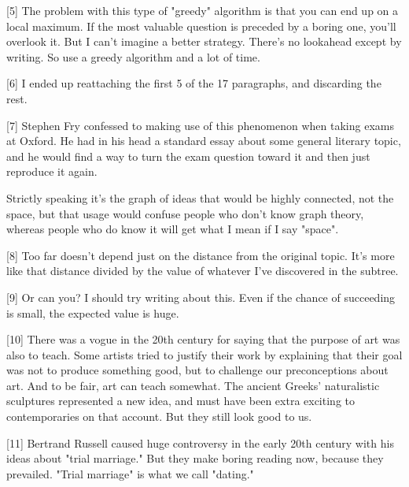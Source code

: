 [5] The problem with this type of "greedy" algorithm is that
                  you can end up on a local maximum. If the most valuable
                  question is preceded by a boring one, you'll overlook it. But
                  I can't imagine a better strategy. There's no lookahead except
                  by writing. So use a greedy algorithm and a lot of time.

[6] I ended up reattaching the first 5 of the 17 paragraphs,
                  and discarding the rest.

[7] Stephen Fry confessed to making use of this phenomenon when
                  taking exams at Oxford. He had in his head a standard essay
                  about some general literary topic, and he would find a way to
                  turn the exam question toward it and then just reproduce it
                  again.

Strictly speaking it's the graph of ideas
                  that would be highly connected, not the space, but that usage
                  would confuse people who don't know graph theory, whereas
                  people who do know it will get what I mean if I say
                  "space".

[8] Too far doesn't depend just on the distance from the
                  original topic. It's more like that distance divided by the
                  value of whatever I've discovered in the subtree.

[9] Or can you? I should try writing about this. Even if the
                  chance of succeeding is small, the expected value is huge.

[10] There was a vogue in the 20th century for saying that the
                  purpose of art was also to teach. Some artists tried to
                  justify their work by explaining that their goal was not to
                  produce something good, but to challenge our preconceptions
                  about art. And to be fair, art can teach somewhat. The ancient
                  Greeks' naturalistic sculptures represented a new idea, and
                  must have been extra exciting to contemporaries on that
                  account. But they still look good to us.

[11] Bertrand Russell caused huge controversy in the early 20th
                  century with his ideas about "trial marriage." But they make
                  boring reading now, because they prevailed. "Trial marriage"
                  is what we call "dating."

